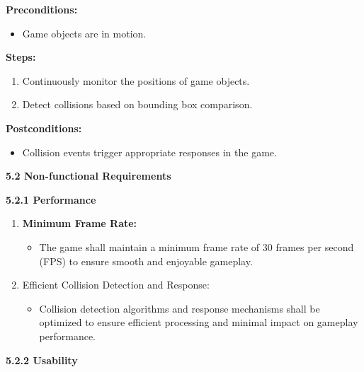 \documentclass[
]{article}
\begin{document}
\textbf{Preconditions:}

\begin{itemize}
\item
  Game objects are in motion.
\end{itemize}

\textbf{Steps:}

\begin{enumerate}
\def\labelenumi{\arabic{enumi}.}
\item
  Continuously monitor the positions of game objects.
\item
  Detect collisions based on bounding box comparison.
\end{enumerate}

\textbf{Postconditions:}

\begin{itemize}
\item
  Collision events trigger appropriate responses in the game.
\end{itemize}

\protect\hypertarget{qbbb}{}{}\textbf{5.2 Non-functional Requirements}

\textbf{5.2.1 Performance}

\begin{enumerate}
\def\labelenumi{\arabic{enumi}.}
\item
  \textbf{Minimum Frame Rate:}

  \begin{itemize}
  \item
    The game shall maintain a minimum frame rate of 30 frames per second
    (FPS) to ensure smooth and enjoyable gameplay.
  \end{itemize}
\item
  Efficient Collision Detection and Response:

  \begin{itemize}
  \item
    Collision detection algorithms and response mechanisms shall be
    optimized to ensure efficient processing and minimal impact on
    gameplay performance.
  \end{itemize}
\end{enumerate}

\textbf{5.2.2 Usability}
\end{document}
